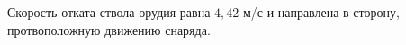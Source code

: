 Скорость отката ствола орудия равна $4,42$ м/с и направлена в сторону, протвоположную движению снаряда.
